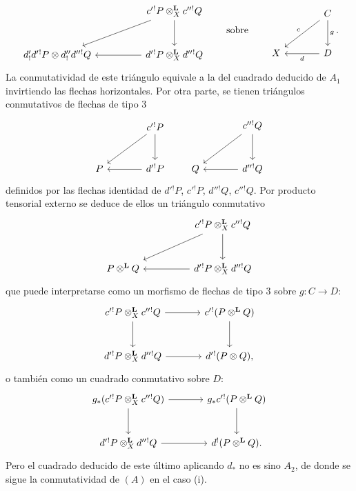 \begin{prooftext}[Demostración]
\[\begin{tikzcd}[column sep=huge,row sep=large]
& c'{}^!P\otimes_X^{\mathbf L}c''{}^!Q \arrow[d] \arrow[dl]\\
d'_!d'{}^!P\otimes d''_!d''{}^!Q &
d'{}^!P\otimes_X^{\mathbf L}d''{}^!Q\arrow[l]
\end{tikzcd}
\qquad\text{sobre}\qquad
\begin{tikzcd}[column sep=large,row sep=large]
& C\arrow[d,"g"]\arrow[dl,"c"']\\
X & D\arrow[l,"d"]
\end{tikzcd}.
\]
La conmutatividad de este triángulo equivale a la del cuadrado deducido de $A_1$ invirtiendo las flechas horizontales. Por otra parte, se tienen triángulos conmutativos de flechas de tipo $3$
\[
\begin{tikzcd}[column sep=large,row sep=large]
& c'{}^!P \arrow[d]\arrow[dl]\\
P & d'{}^!P\arrow[l]
\end{tikzcd}
\qquad
\begin{tikzcd}[column sep=large,row sep=large]
& c''{}^!Q \arrow[d]\arrow[dl]\\
Q & d''{}^!Q\arrow[l]
\end{tikzcd}
\]
definidos por las flechas identidad de $d'{}^!P$, $c'{}^!P$, $d''{}^!Q$, $c''{}^!Q$. Por producto tensorial externo se deduce de ellos un triángulo conmutativo
\[
\begin{tikzcd}[column sep=huge,row sep=large]
& c'{}^!P\otimes_X^{\mathbf L}c''{}^!Q \arrow[d]\arrow[dl]\\
P\otimes^{\mathbf L}Q & d'{}^!P\otimes_X^{\mathbf L}d''{}^!Q\arrow[l]
\end{tikzcd}
\]
que puede interpretarse como un morfismo de flechas de tipo $3$ sobre $g:C\longrightarrow D$:
\[
\begin{tikzcd}[column sep=large,row sep=large]
c'{}^!P\otimes_X^{\mathbf L}c''{}^!Q \arrow[r]\arrow[d] &
c'{}^!(P\otimes^{\mathbf L}Q)\arrow[d]\\
d'{}^!P\otimes_X^{\mathbf L}d''{}^!Q \arrow[r] &
d'{}^!(P\otimes Q),
\end{tikzcd}
\]
o también como un cuadrado conmutativo sobre $D$:
\[
\begin{tikzcd}[column sep=large,row sep=large]
g_*(c'{}^!P\otimes_X^{\mathbf L}c''{}^!Q) \arrow[r]\arrow[d] &
g_*c'{}^!(P\otimes^{\mathbf L}Q)\arrow[d]\\
d'{}^!P\otimes_X^{\mathbf L}d''{}^!Q \arrow[r] &
d^!(P\otimes^{\mathbf L}Q).
\end{tikzcd}
\]
Pero el cuadrado deducido de este último aplicando $d_*$ no es sino $A_2$, de donde se sigue la conmutatividad de $(A)$ en el caso (i).


\end{prooftext}
